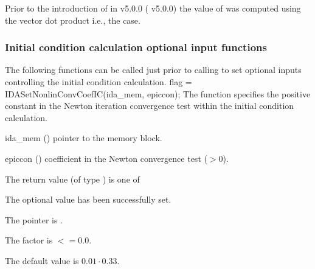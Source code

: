 {{  Prior to the introduction of  in {\sundials} v5.0.0
  ({\ida} v5.0.0) the value of  was computed using the vector
  dot product i.e., the  case.
}
\subsubsection{Initial condition calculation optional input functions}\label{sss:optin_iccalc}
The following functions can be called just prior to calling 
to set optional inputs controlling the initial condition calculation.
{
flag = IDASetNonlinConvCoefIC(ida\_mem, epiccon);
}
{
  The function  specifies the positive constant in
  the Newton iteration convergence test within the initial condition calculation.
}
{
  \begin{args}
  \item[ida\_mem] ()
    pointer to the {\ida} memory block.
  \item[epiccon] ()
    coefficient in the Newton convergence test ($>0$).
  \end{args}
}
{
  The return value  (of type ) is one of
  \begin{args}
  \item[\Id{IDA\_SUCCESS}]
    The optional value has been successfully set.
  \item[\Id{IDA\_MEM\_NULL}]
    The  pointer is .
  \item[\Id{IDA\_ILL\_INPUT}]
    The  factor is $<= 0.0$.
  \end{args}
}
{
  The default value is $0.01 \cdot 0.33$.

}}
